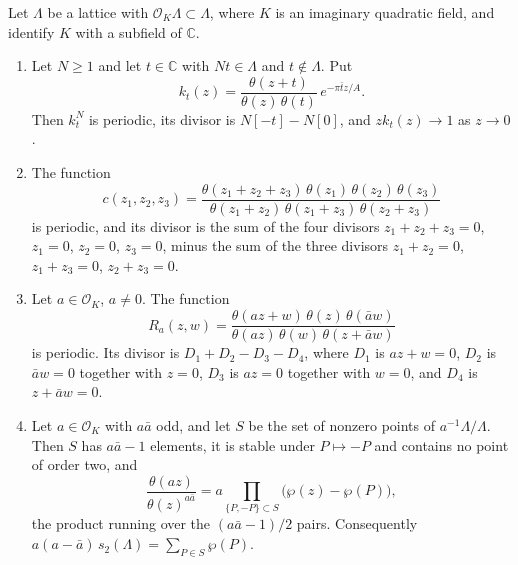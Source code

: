 \begin{lemma}\label{thetaquot}
Let $\Lambda$ be a lattice with $\mathcal O_K\Lambda\subset\Lambda$, where $K$ is an imaginary quadratic field, and identify $K$ with a subfield of $\mathbb C$.
\begin{enumerate}
\item[(i)] Let $N\ge1$ and let $t\in\mathbb C$ with $Nt\in\Lambda$ and $t\notin\Lambda$. Put
\[
k_t(z)=\frac{\theta(z+t)}{\theta(z)\,\theta(t)}\,e^{-\pi\bar tz/A}.
\]
Then $k_t^N$ is periodic, its divisor is $N[-t]-N[0]$, and $zk_t(z)\to1$ as $z\to0$.
\item[(ii)] The function
\[
c(z_1,z_2,z_3)=\frac{\theta(z_1+z_2+z_3)\,\theta(z_1)\,\theta(z_2)\,\theta(z_3)}{\theta(z_1+z_2)\,\theta(z_1+z_3)\,\theta(z_2+z_3)}
\]
is periodic, and its divisor is the sum of the four divisors $z_1+z_2+z_3=0$, $z_1=0$, $z_2=0$, $z_3=0$, minus the sum of the three divisors $z_1+z_2=0$, $z_1+z_3=0$, $z_2+z_3=0$.
\item[(iii)] Let $a\in\mathcal O_K$, $a\ne0$. The function
\[
R_a(z,w)=\frac{\theta(az+w)\,\theta(z)\,\theta(\bar aw)}{\theta(az)\,\theta(w)\,\theta(z+\bar aw)}
\]
is periodic. Its divisor is $D_1+D_2-D_3-D_4$, where $D_1$ is $az+w=0$, $D_2$ is $\bar aw=0$ together with $z=0$, $D_3$ is $az=0$ together with $w=0$, and $D_4$ is $z+\bar aw=0$.
\item[(iv)] Let $a\in\mathcal O_K$ with $a\bar a$ odd, and let $S$ be the set of nonzero points of $a^{-1}\Lambda/\Lambda$. Then $S$ has $a\bar a-1$ elements, it is stable under $P\mapsto-P$ and contains no point of order two, and
\[
\frac{\theta(az)}{\theta(z)^{a\bar a}}=a\prod_{\{P,-P\}\subset S}\big(\wp(z)-\wp(P)\big),
\]
the product running over the $(a\bar a-1)/2$ pairs. Consequently $a(a-\bar a)\,s_2(\Lambda)=\sum_{P\in S}\wp(P)$.
\end{enumerate}
\end{lemma}

